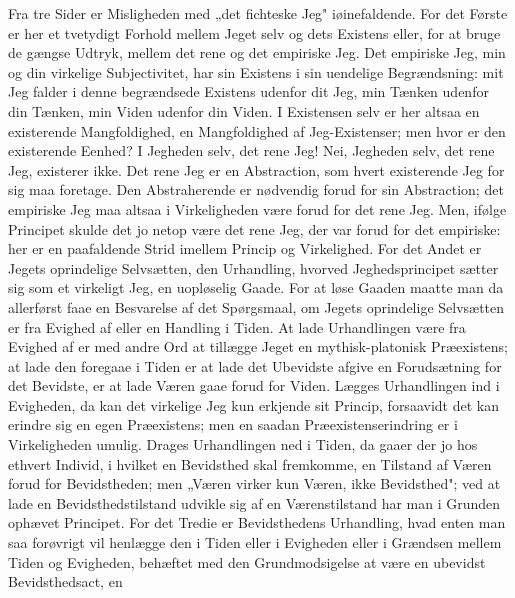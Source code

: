 \documentclass[12pt]{book}
\newcommand{\opage}[1]{\marginnote{\footnotesize\textit{[#1]}}}
\begin{document}
Fra tre Sider er Misligheden med „det fichteske Jeg" iøinefaldende. For det Første er
her et tvetydigt Forhold mellem Jeget selv og dets Existens eller, for at bruge de
gængse Udtryk, mellem det rene og det empiriske Jeg. Det empiriske Jeg, min og din
virkelige Subjectivitet, har sin Existens i sin uendelige Begrændsning: mit Jeg
falder i denne begrændsede Existens udenfor dit Jeg, min Tænken udenfor din Tænken,
min Viden udenfor din Viden. I Existensen selv er her altsaa en existerende
Mangfoldighed, en Mangfoldighed af Jeg-Existenser; men hvor er den existerende
Eenhed? I Jegheden selv, det rene Jeg! Nei, Jegheden selv, det rene Jeg, existerer
ikke. Det rene Jeg er en Abstraction, som hvert existerende Jeg for sig maa foretage.
Den Abstraherende er nødvendig forud for sin Abstraction; det empiriske Jeg maa
altsaa i Virkeligheden være forud for det rene Jeg. Men, ifølge Principet skulde det
jo netop være det rene Jeg, der var forud for det empiriske: her er en paafaldende
Strid imellem Princip og Virkelighed. For det Andet er Jegets oprindelige Selvsætten,
den Urhandling, hvorved Jeghedsprincipet sætter sig som et virkeligt Jeg, en
uopløselig Gaade. For at løse Gaaden maatte man da allerførst faae en Besvarelse af
det Spørgsmaal, om Jegets oprindelige Selvsætten er fra Evighed af eller en Handling
i Tiden. At lade Urhandlingen være fra Evighed af er med andre Ord at tillægge Jeget
en mythisk-platonisk Præexistens; at lade den foregaae i Tiden er at lade det
Ubevidste afgive
\opage{34} en Forudsætning for det Bevidste, er at lade Væren gaae forud for Viden. Lægges
Urhandlingen ind i Evigheden, da kan det virkelige Jeg kun erkjende sit Princip,
forsaavidt det kan erindre sig en egen Præexistens; men en saadan
Præexistenserindring er i Virkeligheden umulig. Drages Urhandlingen ned i Tiden, da
gaaer der jo hos ethvert Individ, i hvilket en Bevidsthed skal fremkomme, en Tilstand
af Væren forud for Bevidstheden; men „Væren virker kun Væren, ikke Bevidsthed"; ved
at lade en Bevidsthedstilstand udvikle sig af en Værenstilstand har man i Grunden
ophævet Principet. For det Tredie er Bevidsthedens Urhandling, hvad enten man saa
forøvrigt vil henlægge den i Tiden eller i Evigheden eller i Grændsen mellem Tiden og
Evigheden, behæftet med den Grundmodsigelse at være en ubevidst Bevidsthedsact, en
\end{document}
